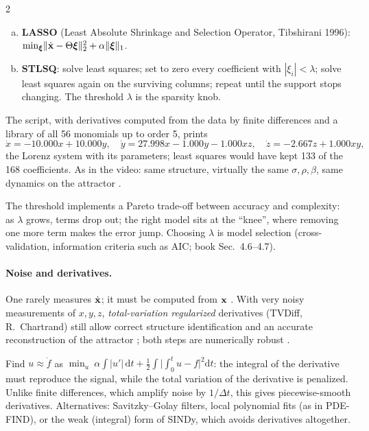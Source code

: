 \begin{paracol}{2}
\begin{definition}
\begin{enumerate}[(a)]
  \item \textbf{LASSO} (Least Absolute Shrinkage and Selection Operator, Tibshirani 1996):
        $\min_{\boldsymbol\xi}\lVert\dot{\mathbf{x}}-\Theta\boldsymbol\xi\rVert_2^2+\alpha\lVert\boldsymbol\xi\rVert_1$.
  \item \textbf{STLSQ}: solve least squares; set to zero every coefficient with
        $|\xi_i|<\lambda$; solve least squares again on the surviving columns; repeat until the support
        stops changing. The threshold $\lambda$ is the sparsity knob.
\end{enumerate}
\end{definition}


The script, with derivatives computed from the data by finite differences and a library of all 56
monomials up to order 5, prints
\[
  \dot x=-10.000x+10.000y,\quad \dot y=27.998x-1.000y-1.000xz,\quad \dot z=-2.667z+1.000xy ,
\]
the Lorenz system with its parameters; least squares would have kept 133 of the 168 coefficients. As in
the video: same structure, virtually the same $\sigma,\rho,\beta$, same dynamics on the attractor
.

\begin{intuition}
The threshold implements a Pareto trade-off between accuracy and complexity: as $\lambda$ grows, terms
drop out; the right model sits at the ``knee'', where removing one more term makes the error jump. Choosing
$\lambda$ is model selection (cross-validation, information criteria such as AIC; book Sec.~4.6--4.7).
\end{intuition}

\paragraph{Noise and derivatives.} One rarely measures $\dot{\mathbf{x}}$; it must be computed from $\mathbf{x}$
. With very noisy measurements of $x,y,z$, \emph{total-variation regularized} derivatives
(TVDiff, R.~Chartrand) still allow correct structure identification and an accurate reconstruction of the
attractor ; both steps are numerically robust .

\begin{secondary}
Find $u\approx\dot f$ as $\min_u\ \alpha\int|u'|\,\mathrm dt+\tfrac12\int\big|\!\int_0^tu-f\big|^2\mathrm dt$:
the integral of the derivative must reproduce the signal, while the total variation of the derivative is
penalized. Unlike finite differences, which amplify noise by $1/\Delta t$, this gives piecewise-smooth
derivatives. Alternatives: Savitzky--Golay filters, local polynomial fits (as in PDE-FIND), or the weak
(integral) form of SINDy, which avoids derivatives altogether.
\end{secondary}


\end{paracol}

